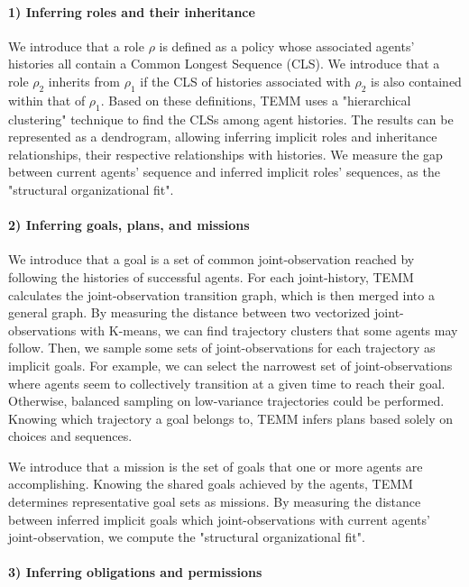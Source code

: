 \documentclass[pdflatex,sn-mathphys-num]{sn-jnl}%
\theoremstyle{thmstyleone}%
\theoremstyle{thmstyletwo}%
\theoremstyle{thmstylethree}%
\begin{document}
\paragraph{1) Inferring roles and their inheritance}

We introduce that a role $\rho$ is defined as a policy whose associated agents' histories all contain a Common Longest Sequence (CLS). We introduce that a role $\rho_2$ inherits from $\rho_1$ if the CLS of histories associated with $\rho_2$ is also contained within that of $\rho_1$.
Based on these definitions, TEMM uses a "hierarchical clustering" technique to find the CLSs among agent histories. The results can be represented as a dendrogram, allowing inferring implicit roles and inheritance relationships, their respective relationships with histories.
We measure the gap between current agents' sequence and inferred implicit roles' sequences, as the "structural organizational fit".

\paragraph{2) Inferring goals, plans, and missions}

We introduce that a goal is a set of common joint-observation reached by following the histories of successful agents.
For each joint-history, TEMM calculates the joint-observation transition graph, which is then merged into a general graph. By measuring the distance between two vectorized joint-observations with K-means, we can find trajectory clusters that some agents may follow. Then, we sample some sets of joint-observations for each trajectory as implicit goals. For example, we can select the narrowest set of joint-observations where agents seem to collectively transition at a given time to reach their goal. Otherwise, balanced sampling on low-variance trajectories could be performed. Knowing which trajectory a goal belongs to, TEMM infers plans based solely on choices and sequences.

We introduce that a mission is the set of goals that one or more agents are accomplishing.
Knowing the shared goals achieved by the agents, TEMM determines representative goal sets as missions.
By measuring the distance between inferred implicit goals which joint-observations with current agents' joint-observation, we compute the "structural organizational fit".

\paragraph{3) Inferring obligations and permissions}
\end{document}
